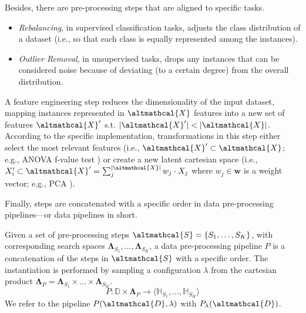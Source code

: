 Besides, there are pre-processing steps that are aligned to specific tasks.
\begin{itemize}
    \item \textit{Rebalancing}, in supervised classification tasks, adjusts the class distribution of a dataset (i.e., so that each class is equally represented among the instances).
    \item \textit{Outlier Removal}, in unsupervised tasks, drops any instances that can be considered noise because of deviating (to a certain degree) from the overall distribution.
\end{itemize}

\begin{example}
    A feature engineering step reduces the dimensionality of the input dataset, mapping instances represented in $\altmathcal{X}$ features into a new set of features  $\altmathcal{X}'$ s.t.  $|\altmathcal{X}'| < |\altmathcal{X}|$.
    According to the specific implementation, transformations in this step either select the most relevant features (i.e., $\altmathcal{X}' \subset \altmathcal{X}$; e.g., ANOVA f-value test \cite{miller1997beyond}) or create a new latent cartesian space (i.e., $X'_{i} \subset \altmathcal{X}' = \sum_{j}^{|\altmathcal{X}|} w_j \cdot X_j$ where $w_j \in \pmb{w}$ is a weight vector; e.g., PCA \cite{kurita2019principal}).
\end{example}

Finally, steps are concatenated with a specific order in data pre-processing pipelines---or data pipelines in short.

\begin{definition}
    \label{background-def:data_pipeline}
    Given a set of pre-processing steps $\altmathcal{S} = \{S_1,\dots, S_{K}\}$, with corresponding search spaces $\pmb{\Lambda}_{S_1}, \dots, \pmb{\Lambda}_{S_K}$, a data pre-processing pipeline $P$ is a concatenation of the steps in $\altmathcal{S}$ with a specific order.
    The instantiation is performed by sampling a configuration $\lambda$ from the cartesian product $\pmb{\Lambda}_P  = \pmb{\Lambda}_{S_1} \times \dots \times \pmb{\Lambda}_{S_K}$.
    \begin{equation*}
        P: \mathbb{D} \times \pmb{\Lambda}_P \rightarrow \langle \mathbb{H}_{S_1}, \dots,  \mathbb{H}_{S_K} \rangle
    \end{equation*}
   We refer to the pipeline $P(\altmathcal{D}, \lambda)$ with $P_{\lambda}(\altmathcal{D})$.
\end{definition}

